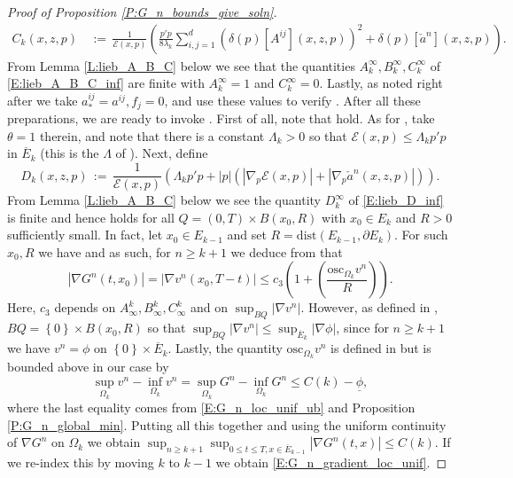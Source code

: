 \documentclass[11pt, letterpaper]{amsart}
\theoremstyle{definition}
\theoremstyle{remark}
\numberwithin{equation}{section}
\newcommand{\EN}{\mathcal{E}}
\newcommand{\dfn}{\, := \,}
\newcommand{\cbra}[1]{\left\{#1\right\}}
\newcommand{\ul}[1]{\underline{#1}}
\newcommand{\ol}[1]{\overline{#1}}
\begin{document}
\begin{proof}[Proof of Proposition \ref{P:G_n_bounds_give_soln}]
\begin{equation}
\begin{split}
C_k(x,z,p) &\dfn \frac{1}{\EN(x,p)}\left(\frac{p'p}{8\lambda_k} \sum_{i,j=1}^d \left(\delta(p)[A^{ij}](x,z,p)\right)^2 + \delta(p)[\check{a}^n](x,z,p)\right).
\end{split}
\end{equation}
From Lemma \ref{L:lieb_A_B_C} below we see that the quantities $A^\infty_k,B^\infty_k,C^\infty_k$ of \eqref{E:lieb_A_B_C_inf} are finite with $A^\infty_k = 1$ and $C^\infty_k = 0$. Lastly, as noted right after \cite[Equation (11.4)]{MR1465184} we take $a^{ij}_{*} = a^{ij}, f_j =0$,
and use these values to verify \cite[Equations (11.17abc)]{MR1465184}.  After all these preparations, we are ready to invoke \cite[Theroem 11.3(b)]{MR1465184}.  First of all, note that \cite[Equations (11.17ac)]{MR1465184} hold.  As for \cite[Equation (11.17b)]{MR1465184}, take $\theta=1$ therein, and note that there is a constant $\Lambda_k>0$ so that $\EN(x,p)\leq \Lambda_k p'p$ in $\ol{E}_k$ (this is the $\Lambda$ of \cite[Equation (11.17b)]{MR1465184}). Next, define
\begin{equation}\label{E:lieb_D}
D_k(x,z,p) \dfn \frac{1}{\EN(x,p)}\left(\Lambda_k p'p + |p|\left(|\nabla_p \EN(x,p)| + |\nabla_p \check{a}^n(x,z,p)|\right)\right).
\end{equation}
From Lemma \ref{L:lieb_A_B_C} below we see the quantity $D^\infty_k$ of \eqref{E:lieb_D_inf} is finite and hence \cite[Equation (11.17b)]{MR1465184} holds for all $Q=(0,T)\times B(x_0,R)$ with $x_0 \in E_{k}$ and $R>0$ sufficiently small.  In fact, let $x_0\in E_{k-1}$ and set $R = \textrm{dist}(E_{k-1},\partial E_k)$.  For such $x_0,R$ we have \cite[Equation (11.17b)]{MR1465184} and as such, for $n\geq k+1$ we deduce from \cite[Theorem 11.3(b)]{MR1465184} that
\begin{equation*}
|\nabla G^n(t,x_0)| = |\nabla v^n(x_0,T-t)| \leq c_3\left(1+\left(\frac{\textrm{osc}_{\Omega_k} v^n}{R}\right)\right).
\end{equation*}
Here, $c_3$ depends on $A^k_\infty,B^k_\infty,C^k_\infty$ and on $\sup_{BQ}|\nabla v^n|$.  However, as defined in \cite[Chapter 2.1]{MR1465184}, $BQ = \cbra{0}\times B(x_0,R)$ so that $\sup_{BQ}|\nabla v^n| \leq \sup_{\ol{E}_k}|\nabla\phi|$, since for $n\geq k+1$ we have $v^n = \phi$ on $\cbra{0}\times \ol{E}_k$. Lastly, the quantity $\textrm{osc}_{\Omega_k} v^n$ is defined in \cite[Section 4.1]{MR1465184} but is bounded above in our case by
\begin{equation*}
\sup_{\Omega_k} v^n - \inf_{\Omega_k} v^n = \sup_{\Omega_k} G^n - \inf_{\Omega_k} G^n \leq C(k)-\ul{\phi},
\end{equation*}
where the last equality comes from \eqref{E:G_n_loc_unif_ub} and Proposition \ref{P:G_n_global_min}. Putting all this together and using the uniform continuity of $\nabla G^n$ on $\Omega_k$ we obtain $\sup_{n\geq k+1}\sup_{0\leq t\leq T,x\in\ol{E}_{k-1}}|\nabla G^n(t,x)| \leq C(k)$. If we re-index this by moving $k$ to $k-1$ we obtain \eqref{E:G_n_gradient_loc_unif}.


\end{proof}
\end{document}
